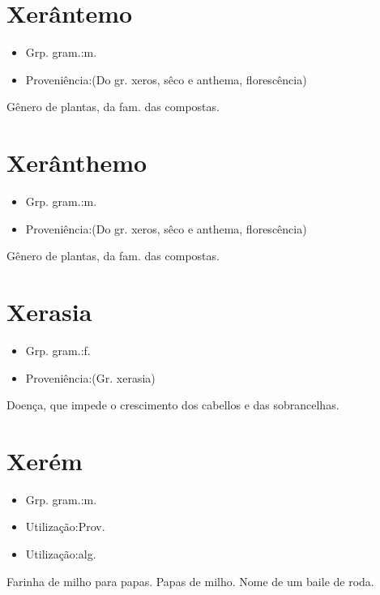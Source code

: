 \section{Xerântemo}
\begin{itemize}
\item {Grp. gram.:m.}
\end{itemize}
\begin{itemize}
\item {Proveniência:(Do gr. \textunderscore xeros\textunderscore , sêco e \textunderscore anthema\textunderscore , florescência)}
\end{itemize}
Gênero de plantas, da fam. das compostas.
\section{Xerânthemo}
\begin{itemize}
\item {Grp. gram.:m.}
\end{itemize}
\begin{itemize}
\item {Proveniência:(Do gr. \textunderscore xeros\textunderscore , sêco e \textunderscore anthema\textunderscore , florescência)}
\end{itemize}
Gênero de plantas, da fam. das compostas.
\section{Xerasia}
\begin{itemize}
\item {Grp. gram.:f.}
\end{itemize}
\begin{itemize}
\item {Proveniência:(Gr. \textunderscore xerasia\textunderscore )}
\end{itemize}
Doença, que impede o crescimento dos cabellos e das sobrancelhas.
\section{Xerém}
\begin{itemize}
\item {Grp. gram.:m.}
\end{itemize}
\begin{itemize}
\item {Utilização:Prov.}
\end{itemize}
\begin{itemize}
\item {Utilização:alg.}
\end{itemize}
Farinha de milho para papas.
Papas de milho.
Nome de um baile de roda.

